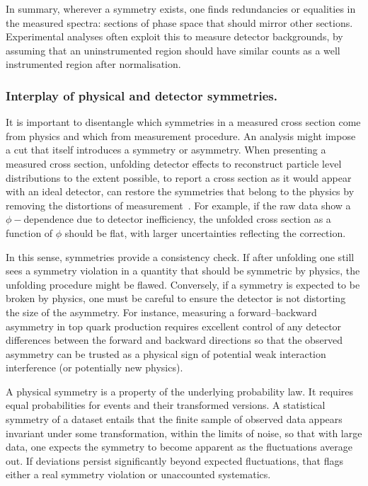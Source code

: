             In summary, wherever a symmetry exists, one finds redundancies or equalities in the measured spectra: sections of phase space that should mirror other sections.
            Experimental analyses often exploit this to measure detector backgrounds, by assuming that an uninstrumented region should have similar counts as a well instrumented region after normalisation.

        \subsubsection{Interplay of physical and detector symmetries.}
            It is important to disentangle which symmetries in a measured cross section come from physics and which from measurement procedure.
            An analysis might impose a cut that itself introduces a symmetry or asymmetry.
            When presenting a measured cross section, unfolding detector effects to reconstruct particle level distributions to the extent possible, to report a cross section as it would appear with an ideal detector, can restore the symmetries that belong to the physics by removing the distortions of measurement~\cite{DAgostini:265717}.
            For example, if the raw data show a $\phi-$dependence due to detector inefficiency, the unfolded cross section as a function of $\phi$ should be flat, with larger uncertainties reflecting the correction.
            
            In this sense, symmetries provide a consistency check.
            If after unfolding one still sees a symmetry violation in a quantity that should be symmetric by physics, the unfolding procedure might be flawed.
            Conversely, if a symmetry is expected to be broken by physics, one must be careful to ensure the detector is not distorting the size of the asymmetry.
            For instance, measuring a forward--backward asymmetry in top quark production requires excellent control of any detector differences between the forward and backward directions so that the observed asymmetry can be trusted as a physical sign of potential weak interaction interference (or potentially new physics).

            A physical symmetry is a property of the underlying probability law.
            It requires equal probabilities for events and their transformed versions.
            A statistical symmetry of a dataset entails that the finite sample of observed data appears invariant under some transformation, within the limits of noise, so that with large data, one expects the symmetry to become apparent as the fluctuations average out.
            If deviations persist significantly beyond expected fluctuations, that flags either a real symmetry violation or unaccounted systematics.
            

